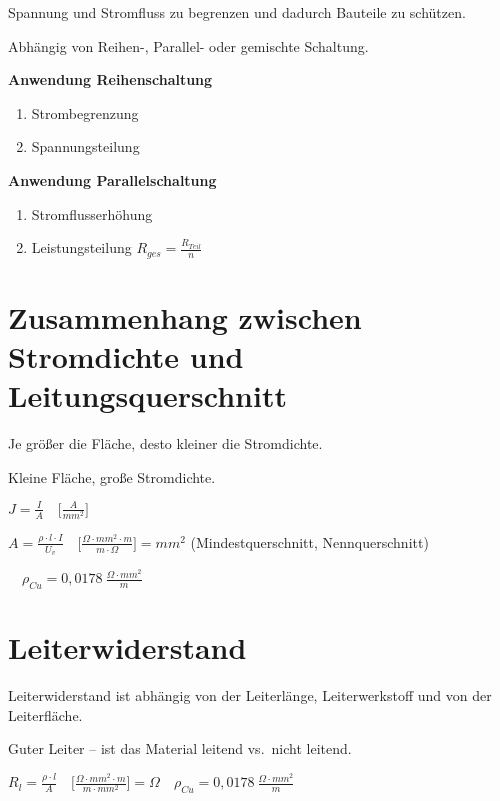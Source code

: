 Spannung und Stromfluss zu begrenzen und dadurch Bauteile zu schützen.

Abhängig von Reihen-, Parallel- oder gemischte Schaltung.

\textbf{Anwendung Reihenschaltung}

\begin{enumerate}
\def\labelenumi{(\arabic{enumi})}
\item
  Strombegrenzung
\item
  Spannungsteilung
\end{enumerate}

\textbf{Anwendung Parallelschaltung}

\begin{enumerate}
\def\labelenumi{(\arabic{enumi})}
\item
  Stromflusserhöhung
\item
  Leistungsteilung $\boxed{R_{ges} = \frac{R_{Teil}}{n}}$
\end{enumerate}

\section{Zusammenhang zwischen Stromdichte und
Leitungsquerschnitt}\label{zusammenhang-zwischen-stromdichte-und-leitungsquerschnitt}

Je größer die Fläche, desto kleiner die Stromdichte.

Kleine Fläche, große Stromdichte.

$\boxed{J = \frac{I}{A}} \quad \bigl[\frac{A}{mm^2}\bigl]$

$\boxed{A = \frac{\rho \cdot l \cdot I}{U_v}} \quad \bigl[\frac{\Omega \cdot mm^2 \cdot m}{m \cdot \Omega}\bigl] = mm^2$
(Mindestquerschnitt, Nennquerschnitt)

$\quad \rho_{Cu} = 0,0178~\frac{\Omega \cdot mm^2}{m}$

\section{Leiterwiderstand}\label{leiterwiderstand}

Leiterwiderstand ist abhängig von der Leiterlänge, Leiterwerkstoff und
von der Leiterfläche.

Guter Leiter -- ist das Material leitend vs.~nicht leitend.

$\boxed{R_l = \frac{\rho \cdot l}{A}} \quad \bigl[\frac{\Omega \cdot mm^2 \cdot m}{m \cdot mm^2}\bigl] = \Omega \quad \rho_{Cu} = 0,0178~\frac{\Omega \cdot mm^2}{m}$

